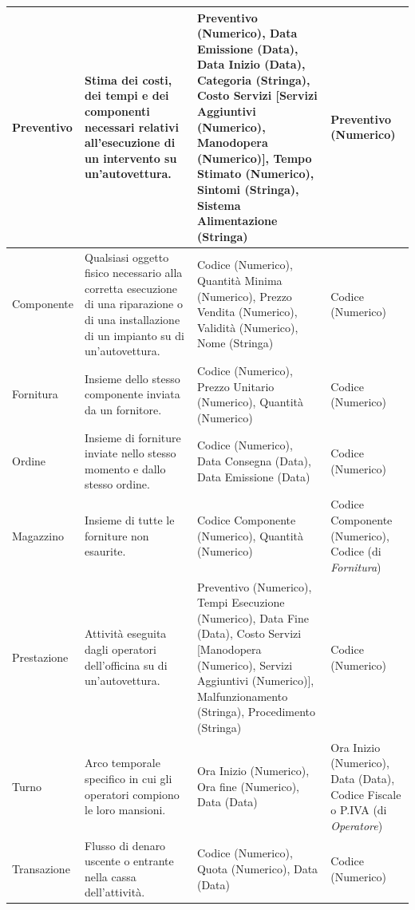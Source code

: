 {\begin{longtable}{| p{2cm} | p{4cm} | p{4cm} | p{2cm} |}
				Preventivo &
				Stima dei costi, dei tempi e dei componenti necessari relativi all’esecuzione di un intervento su un’autovettura. &
				Preventivo (Numerico), Data Emissione (Data), Data Inizio (Data), Categoria (Stringa), Costo Servizi [Servizi Aggiuntivi (Numerico), Manodopera (Numerico)], Tempo Stimato (Numerico), Sintomi (Stringa), Sistema Alimentazione (Stringa) &
				Preventivo (Numerico)
				\\ \hline

				Componente &
				Qualsiasi oggetto fisico necessario alla corretta esecuzione di una riparazione o di una installazione di un impianto su di un’autovettura. &
				Codice (Numerico), Quantità Minima (Numerico), Prezzo Vendita (Numerico), Validità (Numerico), Nome (Stringa) &
				Codice (Numerico)
				\\ \hline

				Fornitura &
				Insieme dello stesso componente inviata da un fornitore. &
				Codice (Numerico), Prezzo Unitario (Numerico), Quantità (Numerico) &
				Codice (Numerico)
				\\ \hline

				Ordine &
				Insieme di forniture inviate nello stesso momento e dallo stesso ordine. &
				Codice (Numerico), Data Consegna (Data), Data Emissione (Data) &
				Codice (Numerico)
				\\ \hline
				
				Magazzino &
				Insieme di tutte le forniture non esaurite. &
				Codice Componente (Numerico), Quantità (Numerico) &
				Codice Componente (Numerico), Codice (di \emph{Fornitura})
				\\ \hline

				Prestazione &
				Attività eseguita dagli operatori dell’officina su di un’autovettura. &
				Preventivo (Numerico), Tempi Esecuzione (Numerico), Data Fine (Data), Costo Servizi [Manodopera (Numerico), Servizi Aggiuntivi (Numerico)], Malfunzionamento (Stringa), Procedimento (Stringa) &
				Codice (Numerico)
				\\ \hline

				Turno &
				Arco temporale specifico in cui gli operatori compiono le loro mansioni. &
				Ora Inizio (Numerico), Ora fine (Numerico), Data (Data) &
				Ora Inizio (Numerico), Data (Data), Codice Fiscale o P.IVA (di \emph{Operatore})
				\\ \hline

				Transazione &
				Flusso di denaro uscente o entrante nella cassa dell’attività. &
				Codice (Numerico), Quota (Numerico), Data (Data) &
				Codice (Numerico)
				\\ \hline


\end{longtable}}
